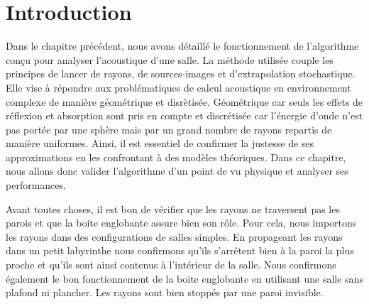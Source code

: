 \section{Introduction}

Dans le chapitre précédent, nous avons détaillé le fonctionnement de l'algorithme conçu pour analyser l'acoustique d'une salle. La méthode utilisée couple les principes de lancer de rayons, de sources-images et d'extrapolation stochastique. Elle vise à répondre aux problématiques de calcul acoustique en environnement complexe de manière géométrique et disrètisée. Géométrique car seuls les effets de réflexion et absorption sont pris en compte et discrétisée car l'énergie d'onde n'est pas portée par une sphère mais par un grand nombre de rayons repartis de manière uniformes. Ainsi, il est essentiel de confirmer la justesse de ses approximations en les confrontant à des modèles théoriques. Dans ce chapitre, nous allons donc valider l'algorithme d'un point de vu physique et analyser ses performances.

Avant toutes choses, il est bon de vérifier que les rayons ne traversent pas les parois et que la boite englobante assure bien son rôle. Pour cela, nous importons les rayons dans des configurations de salles simples. En propageant les rayons dans un petit labyrinthe nous confirmons qu'ils s'arrêtent bien à la paroi la plus proche et qu'ils sont ainsi contenus à l'intérieur de la salle. Nous confirmons également le bon fonctionnement de la boite englobante en utilisant une salle sans plafond ni plancher. Les rayons sont bien stoppés par une paroi invisible.

